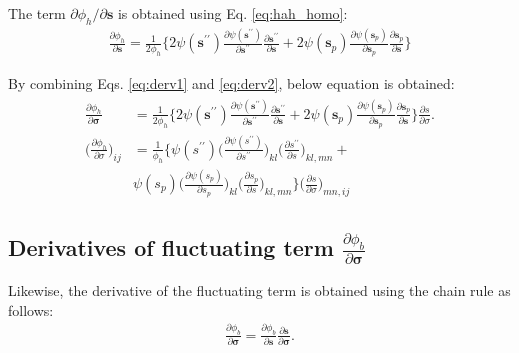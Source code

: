 \documentclass[12pt]{amsart}
\begin{document}
The term $\partial\phi_h/\partial \mathbf{s} $ is obtained using Eq. \ref{eq:hah_homo}:
\begin{eqnarray}
  \label{eq:derv2}
  \frac{\partial{\phi_h}  }{\partial{\mathbf{s}}} = \frac{1}{2\phi_h}\bigg\{ 2\psi(\mathbf{s}^{\prime\prime})\frac{\partial{\psi(\mathbf{s}^{\prime\prime})}}{\partial{\mathbf{s}^{\prime\prime}}}  \frac{\partial\mathbf{s}^{\prime\prime}}{\partial \mathbf{s}}  +  2\psi(\mathbf{s}_p) \frac{\partial{\psi(\mathbf{s}_p)}}{\partial{\mathbf{s}_p}} \frac{\partial{\mathbf{s}_p}}{\partial{\mathbf{s}}}\bigg\}
\end{eqnarray}

By combining Eqs. \ref{eq:derv1} and \ref{eq:derv2}, below equation is obtained:
\begin{eqnarray}
  \label{eq:derv3}
  \begin{split}
  \frac{\partial{\phi_h}}{\partial{\mathbf{\sigma}}} &=\frac{1}{2\phi_h}\bigg\{ 2\psi(\mathbf{s}^{\prime\prime})\frac{\partial{\psi(\mathbf{s}^{\prime\prime})}}{\partial{\mathbf{s}^{\prime\prime}}}  \frac{\partial\mathbf{s}^{\prime\prime}}{\partial \mathbf{s}} + 2\psi(\mathbf{s}_p) \frac{\partial{\psi(\mathbf{s}_p)}}{\partial{\mathbf{s}_p}} \frac{\partial{\mathbf{s}_p}}{\partial{\mathbf{s}}}\bigg\} \frac{\partial{s}}{\partial{\sigma}}.\\
  \Big(\frac{\partial{\phi_h}}{\partial\sigma}\Big)_{ij} &= \frac{1}{\phi_h}\bigg\{ \psi(s^{\prime\prime})\Big(\frac{\partial{\psi(s^{\prime\prime})}}{\partial{s^{\prime\prime}}}\Big)_{kl}  \Big(\frac{\partial s^{\prime\prime}}{\partial s}\Big)_{kl,mn} + \\
    & \psi(s_p) \Big(\frac{\partial{\psi(s_p)}}{\partial{s_p}}\Big)_{kl} \Big(\frac{\partial{s_p}}{\partial s}\Big)_{kl,mn}\bigg\} \Big(\frac{\partial s}{\partial \sigma}\Big)_{mn,ij}
  \end{split}
\end{eqnarray}


\subsection{Derivatives of fluctuating term $\frac{\partial{\phi_b}  }{\partial{\mathbf{\sigma}}}$}
\label{sec:2.2}


Likewise, the derivative of the fluctuating term is obtained using the chain rule as follows:
\begin{eqnarray}
  \label{eq:derv4}
  \frac{\partial{\phi_b}  }{\partial{\mathbf{\sigma}}}  =   \frac{\partial{\phi_b}}{\partial{\mathbf{s}}} \frac{\partial{\mathbf{s}}}{\partial{\mathbf{\sigma}}}.
\end{eqnarray}
\end{document}
